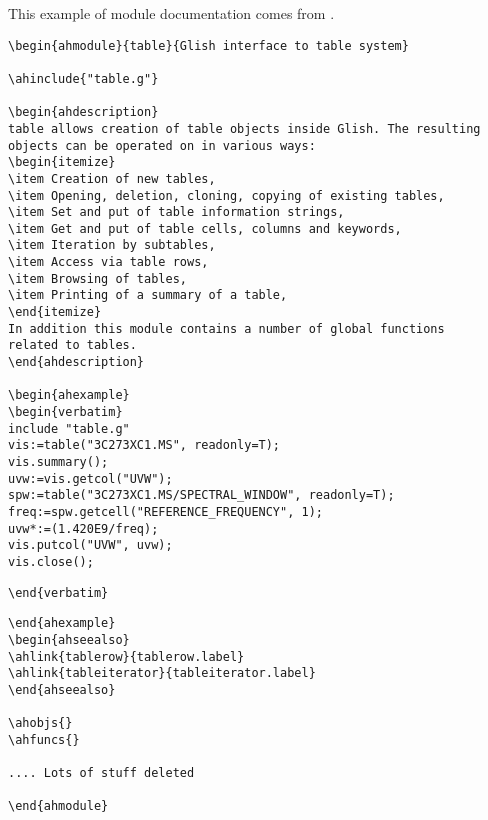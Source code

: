 \label{197:module_example}
This example of module documentation comes from
.
\begin{verbatim}
\begin{ahmodule}{table}{Glish interface to table system}

\ahinclude{"table.g"}

\begin{ahdescription}
table allows creation of table objects inside Glish. The resulting
objects can be operated on in various ways:
\begin{itemize}
\item Creation of new tables,
\item Opening, deletion, cloning, copying of existing tables,
\item Set and put of table information strings,
\item Get and put of table cells, columns and keywords,
\item Iteration by subtables,
\item Access via table rows,
\item Browsing of tables,
\item Printing of a summary of a table,
\end{itemize}
In addition this module contains a number of global functions
related to tables.
\end{ahdescription}

\begin{ahexample}
\begin{verbatim}
include "table.g"
vis:=table("3C273XC1.MS", readonly=T);
vis.summary();
uvw:=vis.getcol("UVW");
spw:=table("3C273XC1.MS/SPECTRAL_WINDOW", readonly=T);
freq:=spw.getcell("REFERENCE_FREQUENCY", 1);
uvw*:=(1.420E9/freq);
vis.putcol("UVW", uvw);
vis.close();
\end{verbatim}
\verb!\end{verbatim}!
\begin{verbatim}
\end{ahexample}
\begin{ahseealso}
\ahlink{tablerow}{tablerow.label}
\ahlink{tableiterator}{tableiterator.label}
\end{ahseealso}

\ahobjs{}
\ahfuncs{}

.... Lots of stuff deleted

\end{ahmodule}
\end{verbatim}
